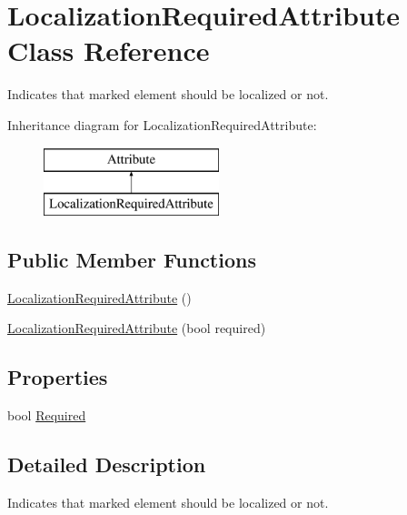 \hypertarget{class_localization_required_attribute}{}\section{Localization\+Required\+Attribute Class Reference}
\label{class_localization_required_attribute}


Indicates that marked element should be localized or not.  


Inheritance diagram for Localization\+Required\+Attribute\+:\begin{figure}[H]
\begin{center}
\leavevmode
\includegraphics[height=2.000000cm]{class_localization_required_attribute}
\end{center}
\end{figure}
\subsection*{Public Member Functions}
\begin{DoxyCompactItemize}
\item 
\mbox{\hyperlink{class_localization_required_attribute_aa2b3c3c66137921e96fd08310066c914}{Localization\+Required\+Attribute}} ()
\item 
\mbox{\hyperlink{class_localization_required_attribute_a7d6235d2f8883d6f6311ca2a95156a9c}{Localization\+Required\+Attribute}} (bool required)
\end{DoxyCompactItemize}
\subsection*{Properties}
\begin{DoxyCompactItemize}
\item 
bool \mbox{\hyperlink{class_localization_required_attribute_af8b46c34356964b9b15c22c7e5113d23}{Required}}
\end{DoxyCompactItemize}


\subsection{Detailed Description}
Indicates that marked element should be localized or not. 


